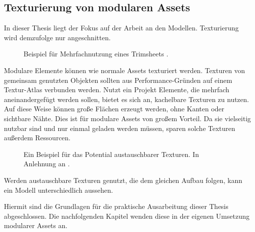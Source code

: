 \subsection{Texturierung  von modularen Assets}
In dieser Thesis liegt der Fokus auf der Arbeit an den Modellen. Texturierung wird demzufolge nur angeschnitten.
\par
\begin{figure}[H]
\centering
  \caption{Beispiel für Mehrfachnutzung eines Trimsheets \parencite{Klafke}.}
	\label{trims}
\end{figure}
\vspace{-10.5pt}
Modulare Elemente können wie normale Assets texturiert werden. Texturen von gemeinsam genutzten Objekten sollten aus Performance-Gründen auf einem Textur-Atlas verbunden werden. Nutzt ein Projekt Elemente, die mehrfach aneinandergefügt werden sollen, bietet es sich an, kachelbare Texturen zu nutzen. Auf diese Weise können große Flächen erzeugt werden, ohne Kanten oder sichtbare Nähte. Dies ist für modulare Assets von großem Vorteil. Da sie vielseitig nutzbar sind und nur einmal geladen werden müssen, sparen solche Texturen außerdem Ressourcen. \parencite{Meler}
\par
\begin{figure}[H]
\centering
  \caption{Ein Beispiel für das Potential austauschbarer Texturen. In Anlehnung an \parencite{Fallout4P}.}
	\label{MaterialSwap}
\end{figure}
\vspace{-10.5pt}
Werden austauschbare Texturen genutzt, die dem gleichen Aufbau folgen, kann ein Modell unterschiedlich aussehen. \parencite{Norris}
\par
Hiermit sind die Grundlagen für die praktische Ausarbeitung dieser Thesis abgeschlossen. Die nachfolgenden Kapitel wenden diese in der eigenen Umsetzung modularer Assets an.
\enlargethispage{11.5pt}